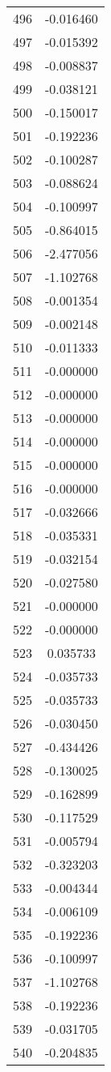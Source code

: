 \documentclass[12pt]{article}
\begin{document}
\begin{longtable}{@{}cc@{}}
496 & -0.016460 \\
497 & -0.015392 \\
498 & -0.008837 \\
499 & -0.038121 \\
500 & -0.150017 \\
501 & -0.192236 \\
502 & -0.100287 \\
503 & -0.088624 \\
504 & -0.100997 \\
505 & -0.864015 \\
506 & -2.477056 \\
507 & -1.102768 \\
508 & -0.001354 \\
509 & -0.002148 \\
510 & -0.011333 \\
511 & -0.000000 \\
512 & -0.000000 \\
513 & -0.000000 \\
514 & -0.000000 \\
515 & -0.000000 \\
516 & -0.000000 \\
517 & -0.032666 \\
518 & -0.035331 \\
519 & -0.032154 \\
520 & -0.027580 \\
521 & -0.000000 \\
522 & -0.000000 \\
523 & 0.035733 \\
524 & -0.035733 \\
525 & -0.035733 \\
526 & -0.030450 \\
527 & -0.434426 \\
528 & -0.130025 \\
529 & -0.162899 \\
530 & -0.117529 \\
531 & -0.005794 \\
532 & -0.323203 \\
533 & -0.004344 \\
534 & -0.006109 \\
535 & -0.192236 \\
536 & -0.100997 \\
537 & -1.102768 \\
538 & -0.192236 \\
539 & -0.031705 \\
540 & -0.204835 \\

\end{longtable}
\end{document}
